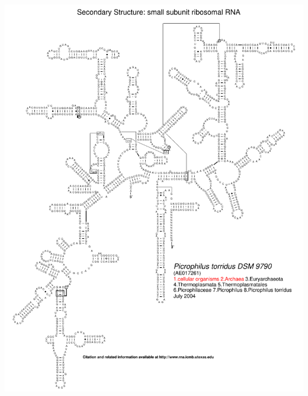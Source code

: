 \documentclass[landscape]{slides}
\begin{document}
\begin{slide}\begin{center}\includegraphics[height=8in]{figs/arc-19}\end{center}\vfill\end{slide}
\end{document}

